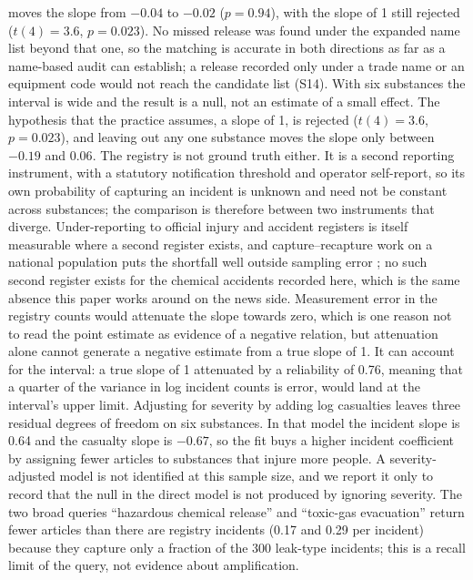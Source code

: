 \documentclass[1p,times]{elsarticle}
\begin{document}
moves the slope from $-0.04$ to $-0.02$ ($p = 0.94$), with the slope of 1 still rejected ($t(4) = 3.6$, $p = 0.023$). No missed release was found under the expanded name list beyond that one, so the matching is accurate in both directions as far as a name-based audit can establish; a release recorded only under a trade name or an equipment code would not reach the candidate list (S14). With six substances the interval is wide and the result is a null, not an estimate of a small effect. The hypothesis that the practice assumes, a slope of 1, is rejected ($t(4) = 3.6$, $p = 0.023$), and leaving out any one substance moves the slope only between $-0.19$ and $0.06$. The registry is not ground truth either. It is a second reporting instrument, with a statutory notification threshold and operator self-report, so its own probability of capturing an incident is unknown and need not be constant across substances; the comparison is therefore between two instruments that diverge. Under-reporting to official injury and accident registers is itself measurable where a second register exists, and capture--recapture work on a national population puts the shortfall well outside sampling error \cite{orellana2021underreporting}; no such second register exists for the chemical accidents recorded here, which is the same absence this paper works around on the news side. Measurement error in the registry counts would attenuate the slope towards zero, which is one reason not to read the point estimate as evidence of a negative relation, but attenuation alone cannot generate a negative estimate from a true slope of 1. It can account for the interval: a true slope of 1 attenuated by a reliability of 0.76, meaning that a quarter of the variance in log incident counts is error, would land at the interval's upper limit. Adjusting for severity by adding log casualties leaves three residual degrees of freedom on six substances. In that model the incident slope is 0.64 and the casualty slope is $-0.67$, so the fit buys a higher incident coefficient by assigning fewer articles to substances that injure more people. A severity-adjusted model is not identified at this sample size, and we report it only to record that the null in the direct model is not produced by ignoring severity. The two broad queries ``hazardous chemical release'' and ``toxic-gas evacuation'' return fewer articles than there are registry incidents (0.17 and 0.29 per incident) because they capture only a fraction of the 300 leak-type incidents; this is a recall limit of the query, not evidence about amplification.
\end{document}
